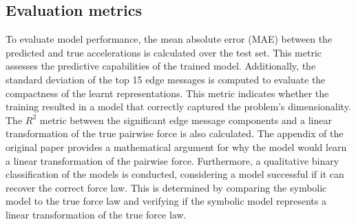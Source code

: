 \documentclass[11pt]{article}
\begin{document}
\subsection{Evaluation metrics}
To evaluate model performance, the mean absolute error (MAE) between the predicted and true accelerations is calculated over the test set. This metric assesses the predictive capabilities of the trained model. Additionally, the standard deviation of the top 15 edge messages is computed to evaluate the compactness of the learnt representations. This metric indicates whether the training resulted in a model that correctly captured the problem's dimensionality. The $R^2$ metric between the significant edge message components and a linear transformation of the true pairwise force is also calculated. The appendix of the original paper provides a mathematical argument for why the model would learn a linear transformation of the pairwise force. Furthermore, a qualitative binary classification of the models is conducted, considering a model successful if it can recover the correct force law. This is determined by comparing the symbolic model to the true force law and verifying if the symbolic model represents a linear transformation of the true force law.
\end{document}
